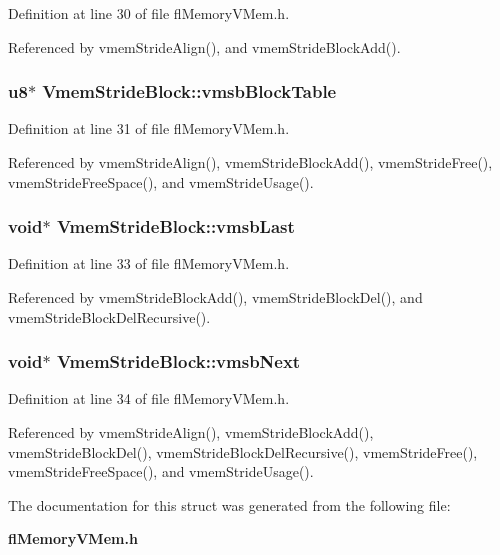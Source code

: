 Definition at line 30 of file fl\-Memory\-VMem.h.

Referenced by vmem\-Stride\-Align(), and vmem\-Stride\-Block\-Add().
\subsubsection{\setlength{\rightskip}{0pt plus 5cm}u8$\ast$ {\bf Vmem\-Stride\-Block::vmsb\-Block\-Table}}\label{structVmemStrideBlock_57272b6ae53212d039d244828a5395d8}




Definition at line 31 of file fl\-Memory\-VMem.h.

Referenced by vmem\-Stride\-Align(), vmem\-Stride\-Block\-Add(), vmem\-Stride\-Free(), vmem\-Stride\-Free\-Space(), and vmem\-Stride\-Usage().
\subsubsection{\setlength{\rightskip}{0pt plus 5cm}void$\ast$ {\bf Vmem\-Stride\-Block::vmsb\-Last}}\label{structVmemStrideBlock_9f30416d01c928e7aa41ce50f61f6fce}




Definition at line 33 of file fl\-Memory\-VMem.h.

Referenced by vmem\-Stride\-Block\-Add(), vmem\-Stride\-Block\-Del(), and vmem\-Stride\-Block\-Del\-Recursive().
\subsubsection{\setlength{\rightskip}{0pt plus 5cm}void$\ast$ {\bf Vmem\-Stride\-Block::vmsb\-Next}}\label{structVmemStrideBlock_c21dddc49deb0cb8618aeecb9d9f12f7}




Definition at line 34 of file fl\-Memory\-VMem.h.

Referenced by vmem\-Stride\-Align(), vmem\-Stride\-Block\-Add(), vmem\-Stride\-Block\-Del(), vmem\-Stride\-Block\-Del\-Recursive(), vmem\-Stride\-Free(), vmem\-Stride\-Free\-Space(), and vmem\-Stride\-Usage().

The documentation for this struct was generated from the following file:\begin{CompactItemize}
\item 
{\bf fl\-Memory\-VMem.h}\end{CompactItemize}
